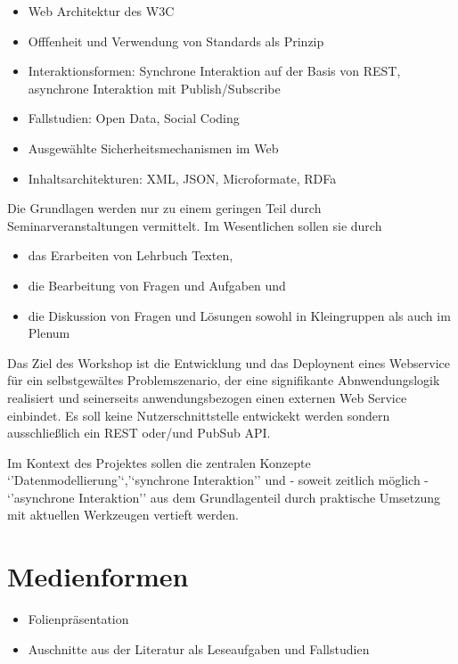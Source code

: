 \begin{itemize}
\tightlist
\item
  Web Architektur des W3C
\item
  Offfenheit und Verwendung von Standards als Prinzip
\item
  Interaktionsformen: Synchrone Interaktion auf der Basis von REST,
  asynchrone Interaktion mit Publish/Subscribe
\item
  Fallstudien: Open Data, Social Coding
\item
  Ausgewählte Sicherheitsmechanismen im Web
\item
  Inhaltsarchitekturen: XML, JSON, Microformate, RDFa
\end{itemize}

Die Grundlagen werden nur zu einem geringen Teil durch
Seminarveranstaltungen vermittelt. Im Wesentlichen sollen sie durch

\begin{itemize}
\tightlist
\item
  das Erarbeiten von Lehrbuch Texten,
\item
  die Bearbeitung von Fragen und Aufgaben und
\item
  die Diskussion von Fragen und Lösungen sowohl in Kleingruppen als auch
  im Plenum
\end{itemize}

Das Ziel des Workshop ist die Entwicklung und das Deploynent eines
Webservice für ein selbstgewältes Problemszenario, der eine signifikante
Abnwendungslogik realisiert und seinerseits anwendungsbezogen einen
externen Web Service einbindet. Es soll keine Nutzerschnittstelle
entwickekt werden sondern ausschließlich ein REST oder/und PubSub API.

Im Kontext des Projektes sollen die zentralen Konzepte
`'Datenmodellierung'`,'`synchrone Interaktion'' und - soweit zeitlich
möglich - `'asynchrone Interaktion'' aus dem Grundlagenteil durch
praktische Umsetzung mit aktuellen Werkzeugen vertieft werden.

\hypertarget{medienformenpathlabelmi-2017modulbeschreibungen-bachelorba_grundlagen-des-web}{%
\section*{Medienformen\label{/mi-2017/modulbeschreibungen-bachelor/BA_Grundlagen-des-web}}\label{medienformenpathlabelmi-2017modulbeschreibungen-bachelorba_grundlagen-des-web}}

\begin{itemize}
\tightlist
\item
  Folienpräsentation
\item
  Auschnitte aus der Literatur als Leseaufgaben und Fallstudien
\end{itemize}


